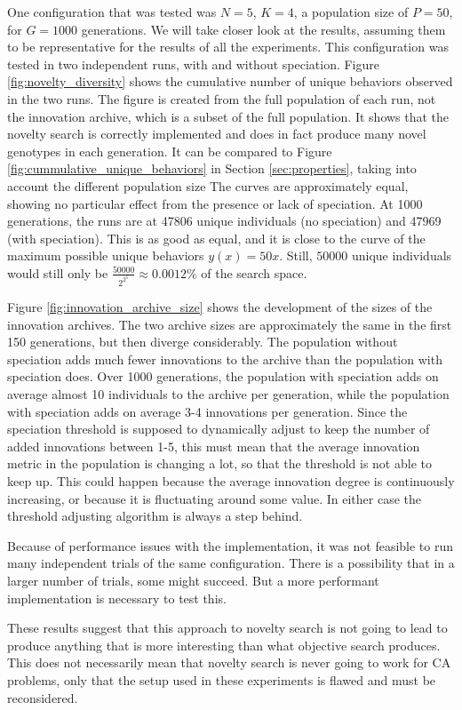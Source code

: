 One configuration that was tested was $N=5$, $K=4$, a population size of $P=50$, for $G=1000$ generations.
We will take closer look at the results, assuming them to be representative for the results of all the experiments.
This configuration was tested in two independent runs, with and without speciation.
Figure \ref{fig:novelty_diversity} shows the cumulative number of unique behaviors observed in the two runs.
The figure is created from the full population of each run, not the innovation archive, which is a subset of the full population.
It shows that the novelty search is correctly implemented and does in fact produce many novel genotypes in each generation.
It can be compared to Figure \ref{fig:cummulative_unique_behaviors} in Section \ref{sec:properties}, taking into account the different population size
The curves are approximately equal, showing no particular effect from the presence or lack of speciation.
At 1000 generations, the runs are at 47806 unique individuals (no speciation) and 47969 (with speciation).
This is as good as equal, and it is close to the curve of the maximum possible unique behaviors $y(x)=50x$.
Still, $50000$ unique individuals would still only be $\frac{50000}{2^{2^{5}}} \approx 0.0012\%$ of the search space.

Figure \ref{fig:innovation_archive_size} shows the development of the sizes of the innovation archives.
The two archive sizes are approximately the same in the first 150 generations, but then diverge considerably.
The population without speciation adds much fewer innovations to the archive than the population with speciation does.
Over 1000 generations, the population with speciation adds on average almost 10 individuals to the archive per generation,
while the population with speciation adds on average 3-4 innovations per generation.
Since the speciation threshold is supposed to dynamically adjust to keep the number of added innovations between 1-5,
this must mean that the average innovation metric in the population is changing a lot, so that the threshold is not able to keep up.
This could happen because the average innovation degree is continuously increasing, or because it is fluctuating around some value.
In either case the threshold adjusting algorithm is always a step behind.

Because of performance issues with the implementation,
it was not feasible to run many independent trials of the same configuration.
There is a possibility that in a larger number of trials, some might succeed.
But a more performant implementation is necessary to test this.

These results suggest that this approach to novelty search is not going to lead to produce anything that is more interesting than what objective search produces.
This does not necessarily mean that novelty search is never going to work for CA problems, only that the setup used in these experiments is flawed and must be reconsidered.
